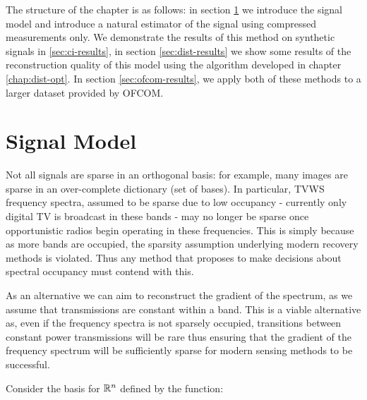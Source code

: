The structure of the chapter is as follows: in section \ref{sec:sig-model} we introduce the signal model and introduce a natural estimator of the signal using compressed measurements only. We demonstrate the results of this method on synthetic signals in \ref{sec:ci-results}, in section \ref{sec:dist-results} we show some results of the reconstruction quality of this model using the algorithm developed in chapter \ref{chap:dist-opt}. In section \ref{sec:ofcom-results}, we apply both of these methods to a larger dataset provided by OFCOM.
\clearpage

\section{Signal Model}\label{sec:sig-model}

Not all signals are sparse in an orthogonal basis: for example, many images are sparse in an over-complete dictionary (set of bases). In particular, TVWS frequency spectra, assumed to be sparse due to low occupancy - currently only digital TV is broadcast in these bands - may no longer be sparse once opportunistic radios begin operating in these frequencies. This is simply because as more bands are occupied, the sparsity assumption underlying modern recovery methods is violated. Thus any method that proposes to make decisions about spectral occupancy must contend with this. 

As an alternative we can aim to reconstruct the gradient of the spectrum, as we assume that transmissions are constant within a band. This is a viable alternative as, even if the frequency spectra is not sparsely occupied, transitions between constant power transmissions will be rare thus ensuring that the gradient of the frequency spectrum will be sufficiently sparse for modern sensing methods to be successful.

Consider the basis for \({\mathbb{R}}^n\) defined by the function:

